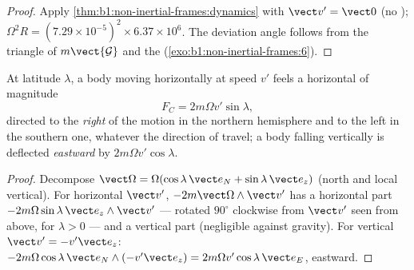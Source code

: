 \begin{proof}
Apply \cref{thm:b1:non-inertial-frames:dynamics} with $\vect v' = \vect 0$
(no ); $\Omega^2R = (7.29\times10^{-5})^2 \times 6.37\times10^6$.
The deviation angle follows from the triangle of $m\vect{\mathcal G}$ and the
 (\cref{exo:b1:non-inertial-frames:6}).
\end{proof}

\begin{proposition}\label{prop:b1:non-inertial-frames:coriolis}
At latitude $\lambda$, a body moving horizontally at speed $v'$ feels a
horizontal  of magnitude
\[
F_C = 2m\Omega v'\sin\lambda ,
\]
directed to the \emph{right} of the motion in the northern hemisphere and
to the left in the southern one, whatever the direction of travel; a
body falling vertically is deflected \emph{eastward} by $2m\Omega v'\cos\lambda$.
\end{proposition}

\begin{proof}
Decompose $\vect\Omega = \Omega(\cos\lambda\,\vect e_N + \sin\lambda\,\vect e_z)$
(north and local vertical). For horizontal $\vect v'$, $-2m\vect\Omega\wedge\vect v'$
has a horizontal part $-2m\Omega\sin\lambda\,\vect e_z\wedge\vect v'$ --- rotated
$90^\circ$ clockwise from $\vect v'$ seen from above, for $\lambda > 0$ ---
and a vertical part (negligible against gravity). For vertical $\vect v' =
-v'\vect e_z$: $-2m\Omega\cos\lambda\,\vect e_N\wedge(-v'\vect e_z) = 2m\Omega v'\cos\lambda\,
\vect e_E$, eastward.
\end{proof}

